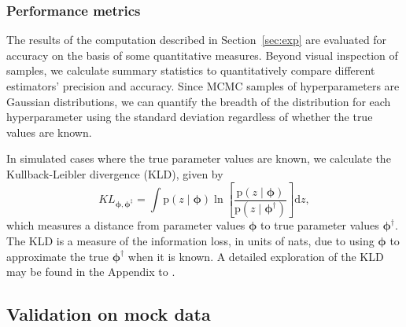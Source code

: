 \documentclass[iop]{emulateapj}
\newcommand{\todo}[3]{{\color{#2}\emph{#1}: #3}}
\newcommand{\aim}[1]{\todo{AIM}{red}{#1}}
\newcommand{\Sect}[1]{Section~\ref{#1}}
\newcommand{\pr}[1]{\ensuremath{\mathrm{p}(#1)}}%
\newcommand{\gvn}{\mid}%
\newcommand{\integral}[2]{\ensuremath{\int #1 \mathrm{d} #2}}
\newcommand{\nz}{$n(z)$}
\newcommand{\bvec}[1]{\ensuremath{\boldsymbol{#1}}}%
\newcommand{\ndphi}{\bvec{\phi}}
\begin{document}
\subsubsection{Performance metrics}
\label{sec:diag}

The results of the computation described in \Sect{sec:exp} are evaluated for accuracy on the basis of some quantitative measures.
Beyond visual inspection of samples, we calculate summary statistics to quantitatively compare different estimators' precision and accuracy.
Since MCMC samples of hyperparameters are Gaussian distributions, we can quantify the breadth of the distribution for each hyperparameter using the standard deviation regardless of whether the true values are known.

In simulated cases where the true parameter values are known, we calculate the Kullback-Leibler divergence (KLD), given by
\begin{equation}
\label{eqn:kl}
KL_{\ndphi,\ndphi^{\ddagger}} = \integral{\pr{z \gvn \ndphi} \ln \left[ \frac{\pr{z \gvn \ndphi}}{\pr{z \gvn \ndphi^{\dagger}}} \right]}{z} ,
\end{equation}
which measures a distance from parameter values $\ndphi$ to true parameter values $\ndphi^{\dagger}$.
The KLD is a measure of the information loss, in units of nats, due to using $\ndphi$ to approximate the true $\ndphi^{\dagger}$ when it is known.
A detailed exploration of the KLD may be found in the Appendix to \citet{malz_approximating_2018}.


\subsection{Validation on mock data}
\label{sec:mock}
\end{document}

